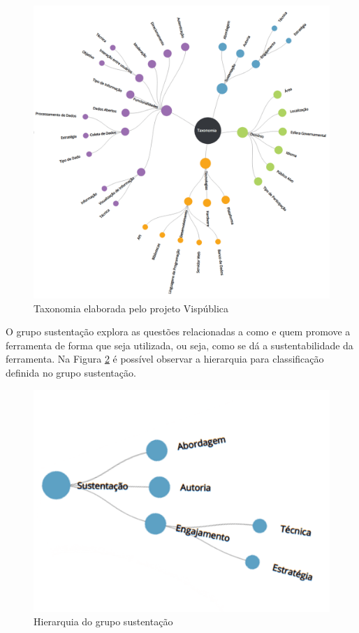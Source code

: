 \begin{figure}[!ht]
    \centering
    \includegraphics[scale=0.30]{./figuras/taxonopart-radial.png}
    \caption{Taxonomia elaborada pelo projeto Vispública}
    \label{fig:taxonomia-vispublica}
\end{figure}

O grupo sustentação explora as questões relacionadas a como e quem promove a ferramenta de forma que seja utilizada, ou seja, como se dá a sustentabilidade da ferramenta. 
Na Figura \ref{fig:grupo-sustentacao} é possível observar a hierarquia para classificação definida no grupo sustentação.

\begin{figure}[!ht]
    \centering
    \includegraphics[scale=0.20]{./figuras/sustentacao.png}
    \caption{Hierarquia do grupo sustentação}
    \label{fig:grupo-sustentacao}
\end{figure}

